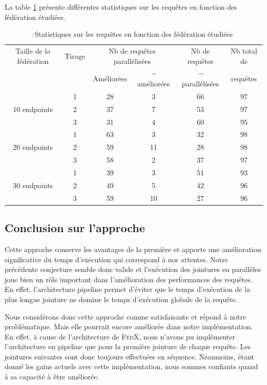 \documentclass[a4paper]{article}
\def\fedx{\textsc{FedX}\xspace}
\begin{document}
La table \ref{table:stats_pipeline} présente différentes statistiques sur les requêtes en fonction des fédération étudiées.

\begin{table}[h]
    \centering
    \begin{tabular}{|c|c|c|c|c|c|}
    \hline
    Taille de la fédération & Tirage & \multicolumn{2}{c|}{Nb de requêtes parallélisées} & Nb de requêtes & Nb total de \\
    \cline{3-4}
     & & Améliorées & $\neg$ améliorées & $\neg$ parallélisées & requêtes \\
    \hline
     & 1 & 28 & 3 & 66 & 97 \\
    \cline{2-6}
    10 endpoints & 2 & 37 & 7 & 53 & 97 \\
    \cline{2-6}
     & 3 & 31 & 4 & 60 & 95 \\
    \hline
     & 1 & 63 & 3 & 32 & 98\\
    \cline{2-6}
    20 endpoints & 2 & 59 & 11 & 28 & 98 \\
    \cline{2-6}
     & 3 & 58 & 2 & 37 & 97 \\
    \hline
     & 1 & 39 & 3 & 51 & 93 \\
    \cline{2-6}
    30 endpoints & 2 & 49 & 5 & 42 & 96 \\
    \cline{2-6}
     & 3 & 59 & 10 & 27 & 96 \\
    \hline
    \end{tabular}
    \caption{Statistiques sur les requêtes en fonction des fédération étudiées}
    \label{table:stats_pipeline}
\end{table}

\subsection{Conclusion sur l'approche}

Cette approche conserve les avantages de la première et apporte une amélioration significative du temps d'exécution qui correspond à nos attentes. Notre précédente conjecture semble donc valide et l'exécution des jointures en parallèles joue bien un rôle important dans l'amélioration des performances des requêtes. En effet, l'architecture pipeline permet d'éviter que le temps d'exécution de la plus longue jointure ne domine le temps d'exécution globale de la requête.

Nous considérons donc cette approche comme satisfaisante et répond à notre problématique. Mais elle pourrait encore améliorée dans notre implémentation. En effet, à cause de l'architecture de \fedx, nous n'avons pu implémenter l'architecture en pipeline que pour la première jointure de chaque requête. Les jointures suivantes sont donc toujours effectuées en séquence. Néanmoins, étant donné les gains actuels avec cette implémentation, nous sommes confiants quand à sa capacité à être améliorée.
\end{document}
